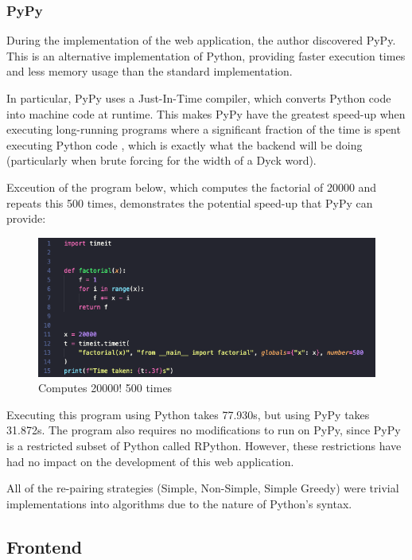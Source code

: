 \subsubsection{PyPy}
During the implementation of the web application, the author discovered PyPy. This is an alternative implementation of Python, providing faster execution times and less memory usage than the standard implementation.

In particular, PyPy uses a Just-In-Time compiler, which converts Python code into machine code at runtime. This makes PyPy have the greatest speed-up when executing long-running programs where a significant fraction of the time is spent executing Python code \cite{whatisPyPy}, which is exactly what the backend will be doing (particularly when brute forcing for the width of a Dyck word). 

Exceution of the program below, which computes the factorial of 20000 and repeats this 500 times, demonstrates the potential speed-up that PyPy can provide:

\begin{figure}[h]
    \centering
    \includegraphics[scale=0.55]{./images/factorialPyPy.png}
    \caption{Computes 20000! 500 times}
\end{figure}

Executing this program using Python takes 77.930s, but using PyPy takes 31.872s. The program also requires no modifications to run on PyPy, since PyPy is a restricted subset of Python called RPython. However, these restrictions have had no impact on the development of this web application.

All of the re-pairing strategies (Simple, Non-Simple, Simple Greedy) were trivial implementations into algorithms due to the nature of Python's syntax.


\subsection{Frontend}


